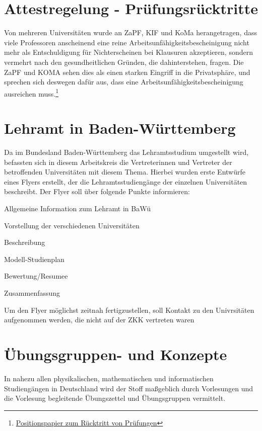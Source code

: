 \documentclass{scrartcl}
\begin{document}
\section*{Attestregelung - Prüfungsrücktritte}

Von mehreren Universitäten wurde an ZaPF, KIF und KoMa herangetragen, dass
viele Professoren anscheinend eine reine Arbeitsunfähigkeitsbescheinigung nicht mehr als
Entschuldigung für Nichterscheinen bei Klausuren akzeptieren,
sondern vermehrt nach den gesundheitlichen Gründen, die dahinterstehen, fragen.
Die ZaPF und KOMA sehen dies als einen starken Eingriff in die Privatsphäre, und
sprechen sich deswegen dafür aus, dass eine Arbeitsunfähigkeitsbescheinigung
ausreichen muss.\footnote{\href{https://vmp.ethz.ch/zapfwiki/images/c/cd/Positionspapier\_SoSe15\_Ruecktritt\_von\_Pruefungen.pdf}{Positionspapier zum Rücktritt von Prüfungen}}

\section*{Lehramt in Baden-Württemberg}

Da im Bundesland Baden-Württemberg das Lehramtsstudium umgestellt wird,
befassten sich in diesem Arbeitskreis die Vertreterinnen und Vertreter der
betroffenden Universitäten mit diesem Thema. Hierbei wurden erste Entwürfe
eines Flyers erstellt, der die Lehramtsstudiengänge der einzelnen Universitäten
beschreibt. Der Flyer soll über folgende Punkte informieren:

\begin{compactenum}
    \item Allgemeine Information zum Lehramt in BaWü
    \item Vorstellung der verschiedenen Universitäten
        \begin{compactenum}
        \item Beschreibung
        \item Modell-Studienplan
        \item Bewertung/Resumee
        \end{compactenum}
    \item Zusammenfassung
\end{compactenum}

Um den Flyer möglichst zeitnah fertigzustellen, soll Kontakt zu den Univrsitäten aufgenommen werden, die nicht auf der ZKK vertreten waren

\newpage
\section*{Übungsgruppen- und Konzepte}
In nahezu allen physikalischen, mathematischen und informatischen Studiengängen
in Deutschland wird der Stoff maßgeblich durch Vorlesungen und die Vorlesung
begleitende Übungszettel und Übungsgruppen vermittelt.
\end{document}

